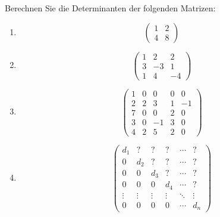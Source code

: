 \begin{ExerciseBlock}
Berechnen Sie die Determinanten der folgenden Matrizen:
\begin{enumerate}[label=\alph*)]
	\item
	\begin{equation}
	 \begin{pmatrix}
	   1 & 2 \\
	   4 & 8 
	 \end{pmatrix}
	\end{equation}

	\item
	\begin{equation}
	 \begin{pmatrix}
	   1 & 2 & 2  \\
	   3 & -3 & 1  \\
	   1 & 4 & -4 
	 \end{pmatrix}
	\end{equation}

	\item 
	\begin{equation}
	 \begin{pmatrix}
	   1 & 0 &  0 & 0 &  0 \\
	   2 & 2 &  3 & 1 & -1 \\
	   7 & 0 &  0 & 2 &  0 \\
	   3 & 0 & -1 & 3 &  0 \\
	   4 & 2 &  5 &  2 & 0 
	 \end{pmatrix}
	\end{equation}

	\item 
	\begin{equation}
	 \begin{pmatrix}
	   d_{1} & ? & ? & ? & \cdots & ? \\
	   0 & d_{2} & ? & ? & \cdots & ? \\
	   0 & 0 & d_{3} & ? & \cdots & ? \\
	   0 & 0 & 0 & d_{4} & \cdots & ? \\
	   \vdots  & \vdots & \vdots & \vdots  & \ddots & \vdots  \\
	   0 & 0 & 0 & 0 & \cdots & d_{n} 
	 \end{pmatrix}
	\end{equation}

\end{enumerate}

\end{ExerciseBlock}

